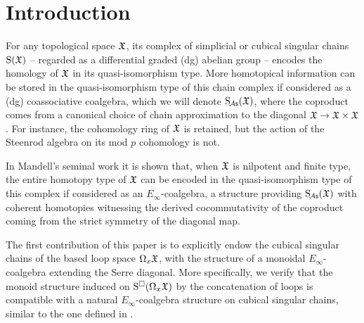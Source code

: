 
\section{Introduction}

For any topological space $\mathfrak{X}$, its complex of simplicial or cubical singular chains $\operatorname{S}(\mathfrak{X})$ -- regarded as a differential graded (dg) abelian group -- encodes the homology of $\mathfrak{X}$ in its quasi-isomorphism type.
More homotopical information can be stored in the quasi-isomorphism type of this chain complex if considered as a (dg) coassociative coalgebra, which we will denote $\operatorname{S_{\!{\mathcal{A}\mathsf{s}}}}(\mathfrak{X})$, where the coproduct comes from a canonical choice of chain approximation to the diagonal $\mathfrak{X} \to \mathfrak{X} \times \mathfrak{X}$.
For instance, the cohomology ring of $\mathfrak{X}$ is retained, but the action of the Steenrod algebra on its mod $p$ cohomology is not.

In Mandell's seminal work \cite{mandell2006homotopy_type} it is shown that, when $\mathfrak{X}$ is nilpotent and finite type, the entire homotopy type of $\mathfrak{X}$ can be encoded in the quasi-isomorphism type of this complex if considered as an $E_\infty$-coalgebra, a structure providing $\operatorname{S_{\!{\mathcal{A}\mathsf{s}}}}(\mathfrak{X})$ with coherent homotopies witnessing the derived cocommutativity of the coproduct coming from the strict symmetry of the diagonal map.


The first contribution of this paper is to explicitly endow the cubical singular chains of the based loop space $\Omega_x \mathfrak{X}$, with the structure of a monoidal $E_\infty$-coalgebra extending the Serre diagonal.
More specifically, we verify that the monoid structure induced on $\operatorname{S^{\square}}(\Omega_x \mathfrak{X})$ by the concatenation of loops is compatible with a natural $E_\infty$-coalgebra structure on cubical singular chains, similar to the one defined in \cite{medina2022cube_einfty}.


